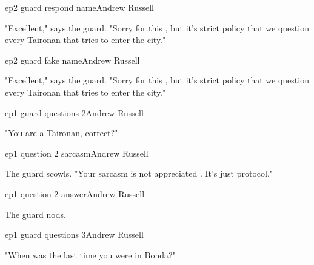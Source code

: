 \documentclass{book}
\begin{document}
\begin{childnode}{ep2 guard respond name}{Andrew Russell}

    "Excellent," says the guard. "Sorry for this \name{}, but it's strict policy that we question every Taironan that tries to enter the city."


\end{childnode}

\begin{childnode}{ep2 guard fake name}{Andrew Russell}

    "Excellent," says the guard. "Sorry for this \fakename{}, but it's strict policy that we question every Taironan that tries to enter the city."


\end{childnode}

\begin{childnode}{ep1 guard questions 2}{Andrew Russell}

    "You are a Taironan, correct?"



\end{childnode}

\begin{childnode}{ep1 question 2 sarcasm}{Andrew Russell}

The guard scowls. "Your sarcasm is not appreciated \mistermiss{}. It's just protocol."


\end{childnode}

\begin{childnode}{ep1 question 2 answer}{Andrew Russell}

    The guard nods.


\end{childnode}

\begin{childnode}{ep1 guard questions 3}{Andrew Russell}

    "When was the last time you were in Bonda?"




\end{childnode}
\end{document}
